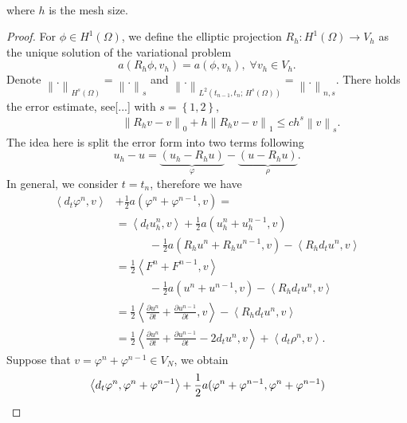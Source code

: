\documentclass[notitlepage,a4paper,fleqn,9pt]{icmfarticle}
\begin{document}
\begin{multicols}{2}
\begin{dl}
\begin{align}
	\end{align}
	where $h$ is the mesh size.
\end{dl}
\begin{proof}
	For $\phi\in H^1(\Omega)$, we define the elliptic projection $R_h:H^1(\Omega)\to V_h$ as the unique solution of the variational problem
	$$a(R_h\phi, v_h)=a(\phi, v_h), \; \forall v_h\in V_h.$$
	Denote $\left\|.\right\|_{H^s(\Omega)}=\left\|.\right\|_{s}$ and $\left\|.\right\|_{L^2(t_{n-1}, t_n;\,H^s(\Omega))}=\left\|.\right\|_{n,s}$.
	There holds the error estimate, see[...] with $s=\left\{1, 2\right\}$,
	\begin{align}\label{ritz}
		\qquad\qquad\;\left\|R_hv-v\right\|_0+h\left\|R_hv-v\right\|_1\leq ch^s\left\|v\right\|_s.
	\end{align}
	The idea here is split the error form into two terms following
	$$u_h-u=\underbrace{\left(u_h-R_hu\right)}_{\varphi}-\underbrace{\left(u-R_hu\right)}_{\rho}.$$
	In general, we consider $t=t_n$, therefore we have %
	\begin{align*}
		\left\langle d_t\varphi^n, v\right\rangle &+\frac{1}{2}a(\varphi^n+\varphi^{n-1}, v)=\\
		&=\left\langle d_tu^n_h, v\right\rangle+\frac{1}{2}a(u^n_h+u^{n-1}_h, v)\\
		&\qquad\quad-\frac{1}{2}a(R_hu^n+R_hu^{n-1}, v)-\left\langle R_hd_tu^n, v\right\rangle\\		
		&=\frac{1}{2}\left \langle F^n+F^{n-1},v\right\rangle\\
		&\qquad\quad-\frac{1}{2}a(u^n+u^{n-1}, v)-\left\langle R_hd_tu^n, v\right\rangle\\
		&=\frac{1}{2}\left\langle \frac{\partial u^n}{\partial t}+\frac{\partial u^{n-1}}{\partial t}, v\right\rangle-\left\langle R_hd_tu^n, v\right\rangle\\
		&=\frac{1}{2}\left\langle \frac{\partial u^n}{\partial t}+\frac{\partial u^{n-1}}{\partial t}-2d_tu^n, v\right\rangle+\left\langle d_t\rho^n, v\right\rangle.
	\end{align*}
	Suppose that $v=\varphi^n+\varphi^{n-1}\in V_N$, we obtain
	\begin{align}
		&\left\langle d_t\varphi^n, \varphi^n+\varphi^{n-1}\right\rangle +\frac{1}{2}a(\varphi^n+\varphi^{n-1}, \varphi^n+\varphi^{n-1})\notag\\

\end{align}
\end{proof}
\end{multicols}
\end{document}
